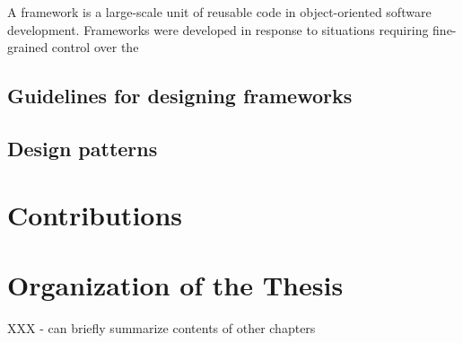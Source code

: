 A framework is a large-scale unit of reusable code in object-oriented
software development.  Frameworks were developed in response to
situations requiring fine-grained control over the

\subsection{Guidelines for designing frameworks}
\subsection{Design patterns}


\section{Contributions}

\section{Organization of the Thesis}

XXX  - can briefly summarize contents of other chapters